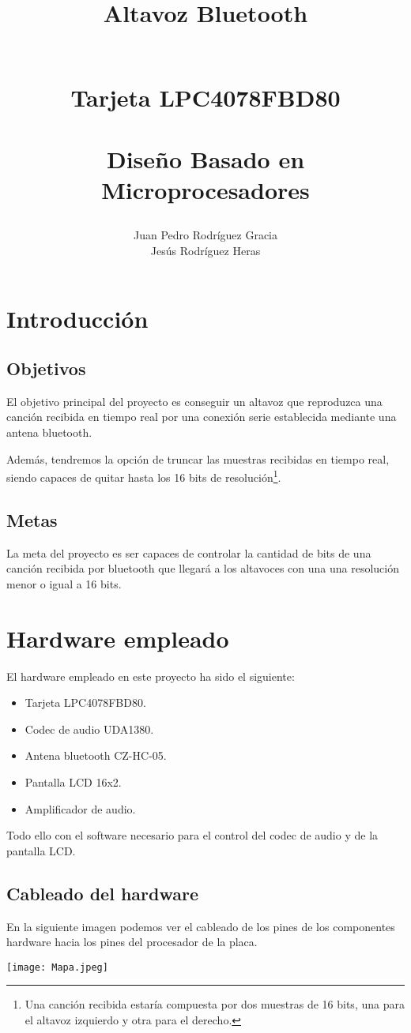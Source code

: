 \documentclass{book}
\title{{\Huge Altavoz Bluetooth}\\\textcolor{White}{ }\\
	\begin{LARGE} 
		Tarjeta LPC4078FBD80\\
		\textcolor{White}{ }\\
		Diseño Basado en Microprocesadores
	\end{LARGE}
	}
\author{Juan Pedro Rodríguez Gracia\\Jesús Rodríguez Heras}
\begin{document}
	\maketitle
	\thispagestyle{empty}
	\newpage
	
	\tableofcontents
	\newpage
	
\chapter{Introducción}
\section{Objetivos}
El objetivo principal del proyecto es conseguir un altavoz que reproduzca una canción recibida en tiempo real por una conexión serie establecida mediante una antena bluetooth.

Además, tendremos la opción de truncar las muestras recibidas en tiempo real, siendo capaces de quitar hasta los 16 bits de resolución\footnote{Una canción recibida estaría compuesta por dos muestras de 16 bits, una para el altavoz izquierdo y otra para el derecho.}.
\section{Metas}
La meta del proyecto es ser capaces de controlar la cantidad de bits de una canción recibida por bluetooth que llegará a los altavoces con una una resolución menor o igual a 16 bits.

\chapter{Hardware empleado}
El hardware empleado en este proyecto ha sido el siguiente:
\begin{itemize}
	\item Tarjeta LPC4078FBD80.
	\item Codec de audio UDA1380.
	\item Antena bluetooth CZ-HC-05.
	\item Pantalla LCD 16x2.
	\item Amplificador de audio.
\end{itemize}

Todo ello con el software necesario para el control del codec de audio y de la pantalla LCD.
\newpage
\section{Cableado del hardware}
En la siguiente imagen podemos ver el cableado de los pines de los componentes hardware hacia los pines del procesador de la placa.
\begin{center}
	\texttt{[image: Mapa.jpeg]}
\end{center}
\end{document}
